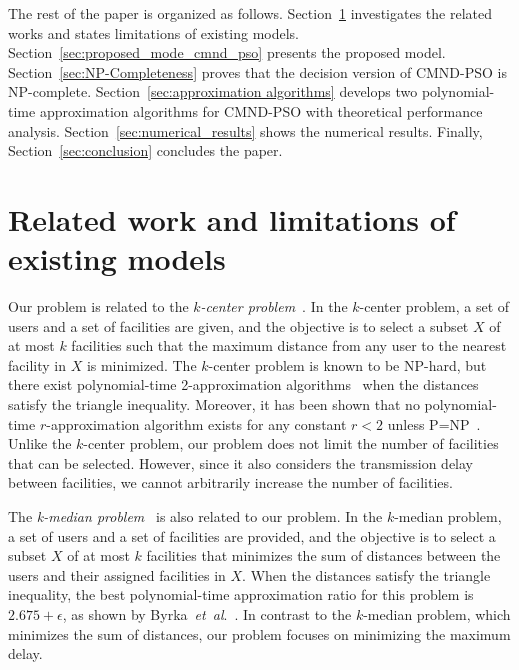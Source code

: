 \documentclass[10pt, letterpaper]{IEEEtran}
\begin{document}
\begin{CJK}{UTF8}{ipxm}
The rest of the paper is organized as follows.
Section~\ref{sec:related_work} investigates the related works and states limitations of existing models.
Section~\ref{sec:proposed_mode_cmnd_pso} presents the proposed model.
Section~\ref{sec:NP-Completeness} proves that the decision version of CMND-PSO is NP-complete.
Section~\ref{sec:approximation algorithms} develops two polynomial-time approximation algorithms for CMND-PSO with theoretical performance analysis.
Section~\ref{sec:numerical_results} shows the numerical results.
Finally, Section~\ref{sec:conclusion} concludes the paper.

\section{Related work and limitations of existing models}
\label{sec:related_work}

Our problem is related to the {\it $k$-center problem}~\cite{Center_2019}. 
In the $k$-center problem, a set of users and a set of facilities are given, and the objective is to select a subset $X$ of at most $k$ facilities such that the maximum distance from any user to the nearest facility in $X$ is minimized. 
The $k$-center problem is known to be NP-hard, but there exist polynomial-time 2-approximation algorithms~\cite{3_7_Gonzalez1985,3_8_Hochbaum1985} when the distances satisfy the triangle inequality. 
Moreover, it has been shown that no polynomial-time $r$-approximation algorithm exists for any constant $r < 2$ unless P=NP~\cite{3_7_Gonzalez1985,3_8_Hochbaum1985}. 
Unlike the $k$-center problem, our problem does not limit the number of facilities that can be selected. 
However, since it also considers the transmission delay between facilities, we cannot arbitrarily increase the number of facilities.

The {\it k-median problem}~\cite{3_12_3SAT} is also related to our problem. 
In the $k$-median problem, a set of users and a set of facilities are provided, and the objective is to select a subset $X$ of at most $k$ facilities that minimizes the sum of distances between the users and their assigned facilities in $X$. 
When the distances satisfy the triangle inequality, the best polynomial-time approximation ratio for this problem is $2.675 + \epsilon$, as shown by Byrka~{\it et~al}.~\cite{3_3'_Byrka2017}. 
In contrast to the $k$-median problem, which minimizes the sum of distances, our problem focuses on minimizing the maximum delay.


\end{CJK}
\end{document}
